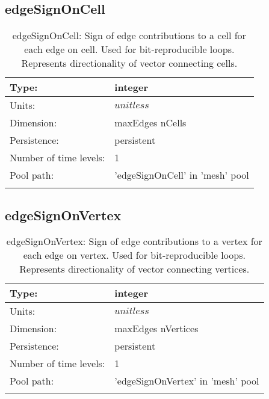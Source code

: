 \subsection[edgeSignOnCell]{edgeSignOnCell}
\label{subsec:var_sec_mesh_edgeSignOnCell}
\begin{center}
\begin{longtable}{| p{2.0in} | p{4.0in} |}
        \hline 
        Type: & integer \\
        \hline 
        Units: & $unitless$ \\
        \hline 
        Dimension: & maxEdges nCells \\
        \hline 
        Persistence: & persistent \\
        \hline 
        Number of time levels: & 1 \\
        \hline 
            Pool path: & 'edgeSignOnCell' in 'mesh' pool
 \\
		 \hline 
    \caption{edgeSignOnCell: Sign of edge contributions to a cell for each edge on cell. Used for bit-reproducible loops. Represents directionality of vector connecting cells.}
\end{longtable}
\end{center}
\subsection[edgeSignOnVertex]{edgeSignOnVertex}
\label{subsec:var_sec_mesh_edgeSignOnVertex}
\begin{center}
\begin{longtable}{| p{2.0in} | p{4.0in} |}
        \hline 
        Type: & integer \\
        \hline 
        Units: & $unitless$ \\
        \hline 
        Dimension: & maxEdges nVertices \\
        \hline 
        Persistence: & persistent \\
        \hline 
        Number of time levels: & 1 \\
        \hline 
            Pool path: & 'edgeSignOnVertex' in 'mesh' pool
 \\
		 \hline 
    \caption{edgeSignOnVertex: Sign of edge contributions to a vertex for each edge on vertex. Used for bit-reproducible loops. Represents directionality of vector connecting vertices.}
\end{longtable}
\end{center}

